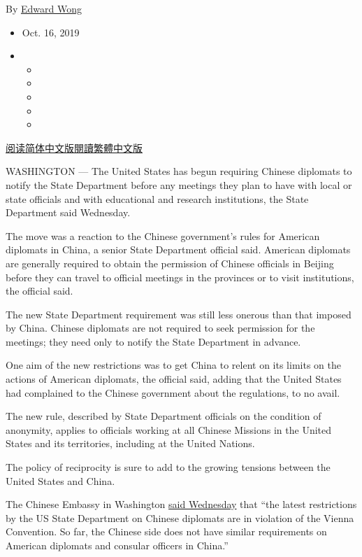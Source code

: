 By \href{https://www.nytimes3xbfgragh.onion/by/edward-wong}{Edward Wong}

\begin{itemize}
\item
  Oct. 16, 2019
\item
  \begin{itemize}
  \item
  \item
  \item
  \item
  \item
  \end{itemize}
\end{itemize}

\href{https://cn.nytimes3xbfgragh.onion/usa/20191017/china-state-department-diplomats/}{阅读简体中文版}\href{https://cn.nytimes3xbfgragh.onion/usa/20191017/china-state-department-diplomats/zh-hant/}{閱讀繁體中文版}

WASHINGTON --- The United States has begun requiring Chinese diplomats
to notify the State Department before any meetings they plan to have
with local or state officials and with educational and research
institutions, the State Department said Wednesday.

The move was a reaction to the Chinese government's rules for American
diplomats in China, a senior State Department official said. American
diplomats are generally required to obtain the permission of Chinese
officials in Beijing before they can travel to official meetings in the
provinces or to visit institutions, the official said.

The new State Department requirement was still less onerous than that
imposed by China. Chinese diplomats are not required to seek permission
for the meetings; they need only to notify the State Department in
advance.

One aim of the new restrictions was to get China to relent on its limits
on the actions of American diplomats, the official said, adding that the
United States had complained to the Chinese government about the
regulations, to no avail.

The new rule, described by State Department officials on the condition
of anonymity, applies to officials working at all Chinese Missions in
the United States and its territories, including at the United Nations.

The policy of reciprocity is sure to add to the growing tensions between
the United States and China.

The Chinese Embassy in Washington
\href{https://twitter.com/ChineseEmbinUS/status/1184597214011822085}{said
Wednesday} that ``the latest restrictions by the US State Department on
Chinese diplomats are in violation of the Vienna Convention. So far, the
Chinese side does not have similar requirements on American diplomats
and consular officers in China.''

